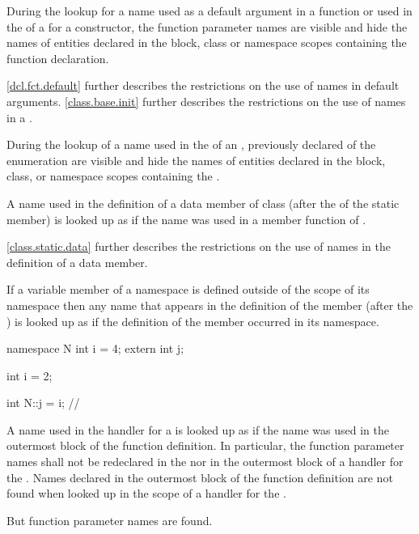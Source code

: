 \pnum
During the lookup for a name used as a default
argument in a function
 or used in the
 of a  for a
constructor, the function parameter names are
visible and hide the names of entities declared in the block, class or
namespace scopes containing the function declaration. \begin{note}
\ref{dcl.fct.default} further describes the restrictions on the use of
names in default arguments. \ref{class.base.init} further describes the
restrictions on the use of names in a .
\end{note}

\pnum
During the lookup of a name used in the
 of an ,
previously declared  of the enumeration are visible
and hide the names of entities declared in the block, class, or namespace
scopes containing the .

\pnum
A name used in the definition of a  data member of class
 (after the 
of the static member) is looked up as if the name was used in a member
function of . \begin{note} \ref{class.static.data} further
describes the restrictions on the use of names in the definition of a
 data member. \end{note}

\pnum
If a variable member of a namespace is defined outside of the scope of
its namespace then any name that appears in the definition of the
member (after the ) is looked up as if the
definition of the member occurred in its namespace.
\begin{example}

\begin{codeblock}
namespace N {
  int i = 4;
  extern int j;
}

int i = 2;

int N::j = i;       // 
\end{codeblock}
\end{example}

\pnum
A name used in the handler for a 
is looked up as if the name was used in the
outermost block of the function definition. In particular, the function
parameter names shall not be redeclared in the
 nor in the outermost block of a handler
for the . Names declared in the outermost
block of the function definition are not found when looked up in the
scope of a handler for the . \begin{note} But
function parameter names are found. \end{note}

